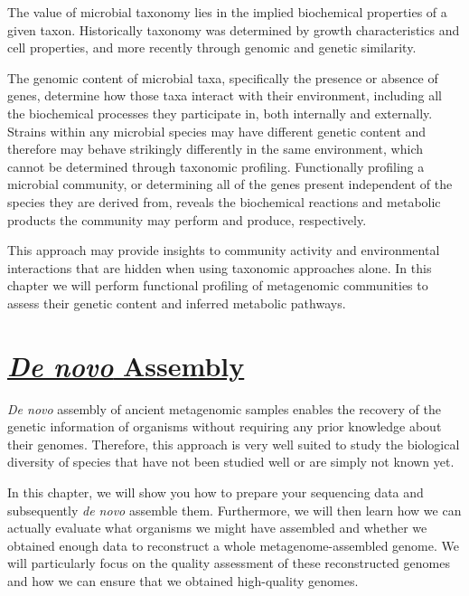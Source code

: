 \documentclass[
  letterpaper,
]{book}
\begin{document}

The value of microbial taxonomy lies in the implied biochemical
properties of a given taxon. Historically taxonomy was determined by
growth characteristics and cell properties, and more recently through
genomic and genetic similarity.

The genomic content of microbial taxa, specifically the presence or
absence of genes, determine how those taxa interact with their
environment, including all the biochemical processes they participate
in, both internally and externally. Strains within any microbial species
may have different genetic content and therefore may behave strikingly
differently in the same environment, which cannot be determined through
taxonomic profiling. Functionally profiling a microbial community, or
determining all of the genes present independent of the species they are
derived from, reveals the biochemical reactions and metabolic products
the community may perform and produce, respectively.

This approach may provide insights to community activity and
environmental interactions that are hidden when using taxonomic
approaches alone. In this chapter we will perform functional profiling
of metagenomic communities to assess their genetic content and inferred
metabolic pathways.

\hypertarget{de-novo-assembly}{%
\section*{\texorpdfstring{\protect\hyperlink{introduction-to-de-novo-genome-assembly}{\emph{De
novo} Assembly}}{De novo Assembly}}\label{de-novo-assembly}}


\emph{De novo} assembly of ancient metagenomic samples enables the
recovery of the genetic information of organisms without requiring any
prior knowledge about their genomes. Therefore, this approach is very
well suited to study the biological diversity of species that have not
been studied well or are simply not known yet.

In this chapter, we will show you how to prepare your sequencing data
and subsequently \emph{de novo} assemble them. Furthermore, we will then
learn how we can actually evaluate what organisms we might have
assembled and whether we obtained enough data to reconstruct a whole
metagenome-assembled genome. We will particularly focus on the quality
assessment of these reconstructed genomes and how we can ensure that we
obtained high-quality genomes.
\end{document}

